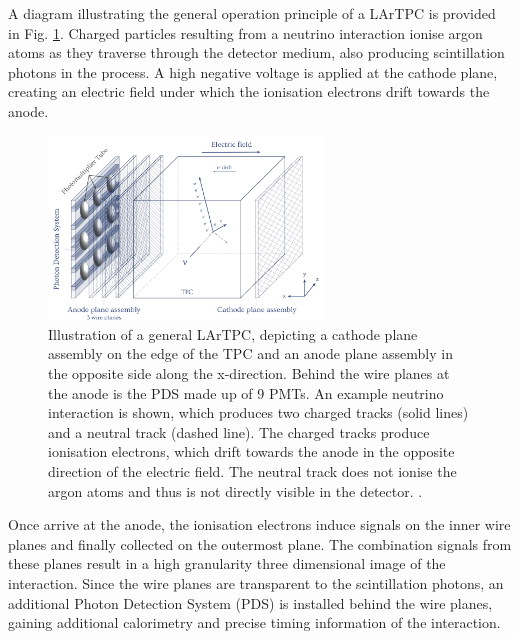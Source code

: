 A diagram illustrating the general operation principle of a LArTPC is provided in Fig. \ref{fig:LARTPC}.
Charged particles resulting from a neutrino interaction ionise argon atoms as they traverse through the detector medium, also producing scintillation photons in the process.
A high negative voltage is applied at the cathode plane, creating an electric field under which the ionisation electrons drift towards the anode.
\begin{figure}[htbp] 
\centering    
\includegraphics[width=0.65\textwidth]{LARTPC}
\caption[LARTPC]{
Illustration of a general LArTPC, depicting a cathode plane assembly on the edge of the TPC and an anode plane assembly in the opposite side along the x-direction.
Behind the wire planes at the anode is the PDS made up of 9 PMTs.   
An example neutrino interaction is shown, which produces two charged tracks (solid lines) and a neutral track (dashed line). 
The charged tracks produce ionisation electrons, which drift towards the anode in the opposite direction of the electric field. 
The neutral track does not ionise the argon atoms and thus is not directly visible in the detector. \cite{RhiannonPhD}.
}
\label{fig:LARTPC}
\end{figure}
Once arrive at the anode, the ionisation electrons induce signals on the inner wire planes and finally collected on the outermost plane.
The combination signals from these planes result in a high granularity three dimensional image of the interaction.
Since the wire planes are transparent to the scintillation photons, an additional Photon Detection System (PDS) is installed behind the wire planes, gaining additional calorimetry and precise timing information of the interaction.


